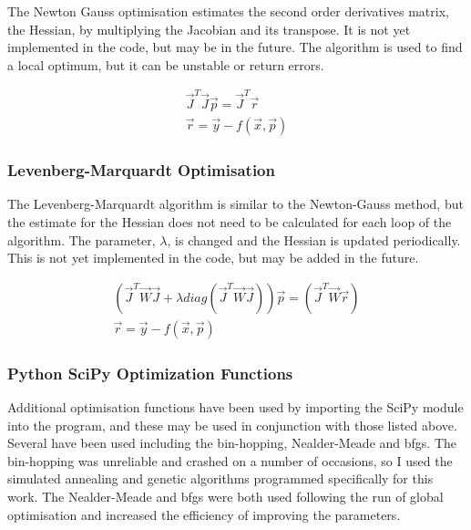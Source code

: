 The Newton Gauss optimisation estimates the second order derivatives matrix, the Hessian, by multiplying the Jacobian and its transpose.  It is not yet implemented in the code, but may be in the future.  The algorithm is used to find a local optimum, but it can be unstable or return errors.

\begin{equation}
\begin{split}
\vec{J}^{T} \vec{J} \vec{p} = \vec{J}^{T} \vec{r} \\
\vec{r} = \vec{y} - f(\vec{x}, \vec{p})
\end{split}
\label{eq:eqNewtonGauss}
\end{equation}

\subsubsection{Levenberg-Marquardt Optimisation}

The Levenberg-Marquardt algorithm is similar to the Newton-Gauss method, but the estimate for the Hessian does not need to be calculated for each loop of the algorithm.  The parameter, $\lambda$, is changed and the Hessian is updated periodically.  This is not yet implemented in the code, but may be added in the future.

\begin{equation}
\begin{split}
\left( \vec{J}^{T} \vec{W} \vec{J} + \lambda diag\left( \vec{J}^{T} \vec{W} \vec{J} \right) \right) \vec{p} = {\left(\vec{J}^{T} \vec{W} \vec{r} \right)} \\
\vec{r} = \vec{y} - f(\vec{x}, \vec{p})
\end{split}
\label{eq:eqLevenbergMarquardt}
\end{equation}


\subsubsection{Python SciPy Optimization Functions}

Additional optimisation functions have been used by importing the SciPy module into the program, and these may be used in conjunction with those listed above.  Several have been used including the bin-hopping, Nealder-Meade and \acrshort{bfgs}.  The bin-hopping was unreliable and crashed on a number of occasions, so I used the simulated annealing and genetic algorithms programmed specifically for this work.  The Nealder-Meade and \acrshort{bfgs} were both used following the run of global optimisation and increased the efficiency of improving the parameters.






